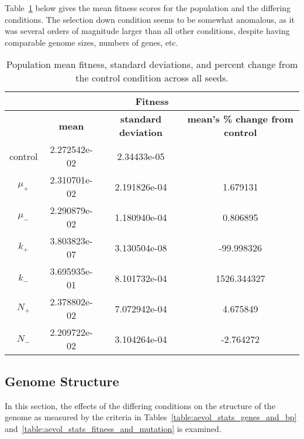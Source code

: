 Table~\ref{table:fitness_means_std_dev} below gives the mean fitness scores for the population and the differing conditions. The selection down condition seems to be somewhat anomalous, as it was several orders of magnitude larger than all other conditions, despite having comparable genome sizes, numbers of genes, etc.
\begin{table}[H]
	\centering
	\begin{tabular}{|c||c|c|c|}
		\hline
		\multicolumn{4}{c}{\Large \textbf{Fitness}} \\
		\hline
		& \textbf{mean} & \textbf{standard deviation} & \textbf{mean's \% change from control} \\
		\hline \hline
		control & 2.272542e-02 & 2.34433e-05 & \textemdash \\ 
		\hline
		$\mu_+$ & 2.310701e-02 & 2.191826e-04 & 1.679131 \\ 
		\hline
		$\mu_-$ & 2.290879e-02 & 1.180940e-04 & 0.806895 \\ 
		\hline
		$k_+$ & 3.803823e-07 & 3.130504e-08 & -99.998326 \\ 
		\hline
		$k_-$ & 3.695935e-01 & 8.101732e-04 & 1526.344327 \\ 
		\hline
		$N_+$ & 2.378802e-02 & 7.072942e-04 & 4.675849 \\ 
		\hline
		$N_-$ & 2.209722e-02 & 3.104264e-04 & -2.764272 \\ 
		\hline
	\end{tabular}
	\caption[Fitness means and standard deviations.]{Population mean fitness, standard deviations, and percent change from the control condition across all seeds. }
	\label{table:fitness_means_std_dev}
\end{table}

\subsection{Genome Structure}
In this section, the effects of the differing conditions on the structure of the genome as measured by the criteria in Tables~\ref{table:aevol_stats_genes_and_bp} and~\ref{table:aevol_stats_fitness_and_mutation} is examined. 

